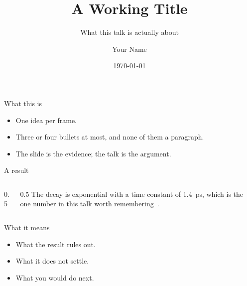 \documentclass[aspectratio=169]{beamer}
\title{A Working Title}
\subtitle{What this talk is actually about}
\author{Your Name}
\institute{Where you are}
\date{\today}
\begin{document}
\begin{frame}
  \titlepage
\end{frame}

\begin{frame}{What this is}
  \begin{itemize}
    \item One idea per frame.
    \item Three or four bullets at most, and none of them a paragraph.
    \item The slide is the evidence; the talk is the argument.
  \end{itemize}
\end{frame}

\begin{frame}{A result}
  \begin{columns}
    \begin{column}{0.5\textwidth}
    \end{column}
    \begin{column}{0.5\textwidth}
      The decay is exponential with a time constant of
      \SI{1.4}{\pico\second}, which is the one number in this talk worth
      remembering~\cite{knuth1984}.
    \end{column}
  \end{columns}
\end{frame}

\begin{frame}{What it means}
  \begin{itemize}
    \item What the result rules out.
    \item What it does not settle.
    \item What you would do next.
  \end{itemize}
\end{frame}
\end{document}
